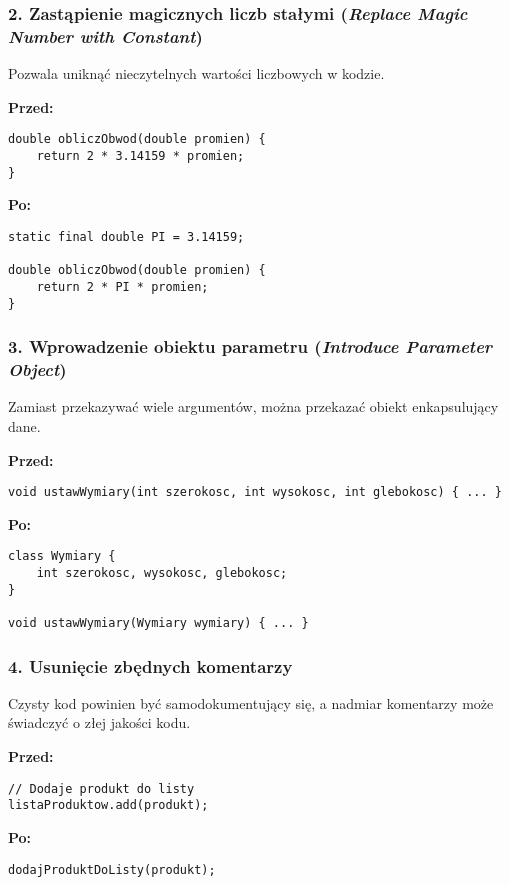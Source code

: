 \subsubsection{2. Zastąpienie magicznych liczb stałymi (\textit{Replace Magic Number with Constant})}
Pozwala uniknąć nieczytelnych wartości liczbowych w kodzie.

\textbf{Przed:}
\begin{verbatim}
double obliczObwod(double promien) {
    return 2 * 3.14159 * promien;
}
\end{verbatim}

\textbf{Po:}
\begin{verbatim}
static final double PI = 3.14159;

double obliczObwod(double promien) {
    return 2 * PI * promien;
}
\end{verbatim}

\subsubsection{3. Wprowadzenie obiektu parametru (\textit{Introduce Parameter Object})}
Zamiast przekazywać wiele argumentów, można przekazać obiekt enkapsulujący dane.

\textbf{Przed:}
\begin{verbatim}
void ustawWymiary(int szerokosc, int wysokosc, int glebokosc) { ... }
\end{verbatim}

\textbf{Po:}
\begin{verbatim}
class Wymiary {
    int szerokosc, wysokosc, glebokosc;
}

void ustawWymiary(Wymiary wymiary) { ... }
\end{verbatim}

\subsubsection{4. Usunięcie zbędnych komentarzy}
Czysty kod powinien być samodokumentujący się, a nadmiar komentarzy może świadczyć o złej jakości kodu.

\textbf{Przed:}
\begin{verbatim}
// Dodaje produkt do listy
listaProduktow.add(produkt);
\end{verbatim}

\textbf{Po:}
\begin{verbatim}
dodajProduktDoListy(produkt);
\end{verbatim}

